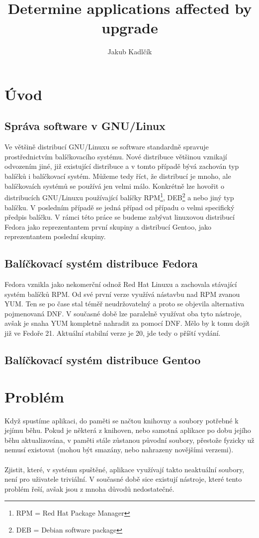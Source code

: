 \documentclass[10pt,a4paper]{article}
\title{Determine applications affected by upgrade}
\author{Jakub Kadlčík}
\begin{document}
	\maketitle
	\newpage



	\tableofcontents
	\newpage

	\section{Úvod}
		\subsection{Správa software v GNU/Linux}
		Ve většině distribucí GNU/Linuxu se software standardně spravuje prostřednictvím balíčkovacího systému. Nové distribuce většinou vznikají odvozením jiné, již existující distribuce a v tomto případě bývá zachován typ balíčků i balíčkovací systém. Můžeme tedy říct, že distribucí je mnoho, ale balíčkovaích systémů se používá jen velmi málo. Konkrétně lze hovořit o distribucích GNU/Linuxu používající balíčky RPM\footnote{RPM = Red Hat Package Manager}, DEB\footnote{DEB = Debian software package} a nebo jiný typ balíčku. V posledním případě se jedná případ od případu o velmi specifický předpis balíčku. V rámci této práce se budeme zabývat linuxovou distribucí Fedora jako reprezentantem první skupiny a distribucí Gentoo, jako reprezentantem poslední skupiny.

		\subsection{Balíčkovací systém distribuce Fedora}
		Fedora vznikla jako nekomerční odnož Red Hat Linuxu a zachovala stávající systém balíčků RPM\@. Od své první verze využívá nástavbu nad RPM zvanou YUM\@. Ten se po čase stal téměř neudržovatelný a proto se objevila alternativa pojmenovaná DNF\@. V současné době lze paralelně využívat oba tyto nástroje, avšak je snaha YUM kompletně nahradit za pomocí DNF\@. Mělo by k tomu dojít již ve Fedoře 21. Aktuální stabilní verze je 20, jde tedy o příští vydání.

		\subsection{Balíčkovací systém distribuce Gentoo}

	\section{Problém}
	Když spustíme aplikaci, do paměti se načtou knihovny a soubory potřebné k jejímu běhu. Pokud je některá z knihoven, nebo samotná aplikace po dobu jejího běhu aktualizována, v paměti stále zůstanou původní soubory, přestože fyzicky už nemusí existovat (mohou být smazány, nebo nahrazeny novějšími verzemi).
	\\\\
	Zjistit, které, v systému spuštěné, aplikace využívají takto neaktuální soubory, není pro uživatele triviální. V současné době sice existují nástroje, které tento problém řeší, avšak jsou z mnoha důvodů nedostatečné.
\end{document}
